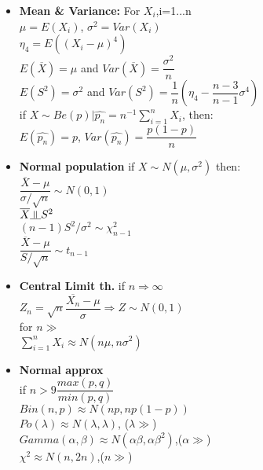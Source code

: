 \documentclass[a4paper, 10pt, landscape]{article}
\begin{document}
\begin{multicols*}{4}
\begin{itemize}
\item{\textbf{Mean \& Variance:} For $X_i$,i=1...n \\ \textbullet $\mu=E(X_i)$, $\sigma^2=Var(X_i)$ \\ \textbullet $\eta_4 = E((X_i-\mu)^4)$ \\ \textbullet $E(\overline{X})=\mu$ and $Var(\overline{X})=\dfrac{\sigma^2}{n}$ \\ \textbullet $E(S^2)=\sigma^2$ and $Var(S^2)=\dfrac{1}{n}\left( \eta_4 - \dfrac{n-3}{n-1}\sigma^4 \right)$ \\ \textbullet if $X\sim Be(p)|\hat{p_n} = n^{-1}\displaystyle{\sum_{i=1}^n X_i}$, then: \\ \textbullet $E(\hat{p_n})=p$, $Var(\hat{p_n})=\dfrac{p(1-p)}{n}$}
\item{\textbf{Normal population} if $X\sim N(\mu, \sigma^2)$ then: \\ \textbullet $\dfrac{\overline{X}-\mu }{\sigma /\sqrt{n}} \sim N(0,1)$ \\ \textbullet $\overline{X} \indep S^2$ \\ \textbullet $(n-1)S^2/\sigma^2 \sim \chi^2_{n-1}$ \\ \textbullet $\dfrac{\overline{X}-\mu }{S /\sqrt{n}} \sim t_{n-1}$}
\item{\textbf{Central Limit th.} if $n\Rightarrow \infty$\\ \textbullet $Z_n = \sqrt{n}\dfrac{\overline{X_n}-\mu}{\sigma} \Rightarrow Z \sim N(0,1)$ \\ for $n\gg$ \\ \textbullet $\displaystyle{\sum^n_{i=1} X_i \approx N(n\mu , n\sigma^2)}$}
\item{\textbf{Normal approx } \\ if $n>9\dfrac{max(p,q)}{min(p,q)}$ \\ \textbullet $Bin(n,p)\approx N(np,np(1-p))$ \\ \textbullet $Po(\lambda) \approx N(\lambda , \lambda)$, ($\lambda\gg$) \\ \textbullet $Gamma(\alpha, \beta) \approx N(\alpha \beta , \alpha \beta ^2)$,($\alpha \gg$) \\ \textbullet $\chi^2 \approx N(n,2n)$,($n\gg$)}
\end{itemize}


\end{multicols*}
\end{document}
